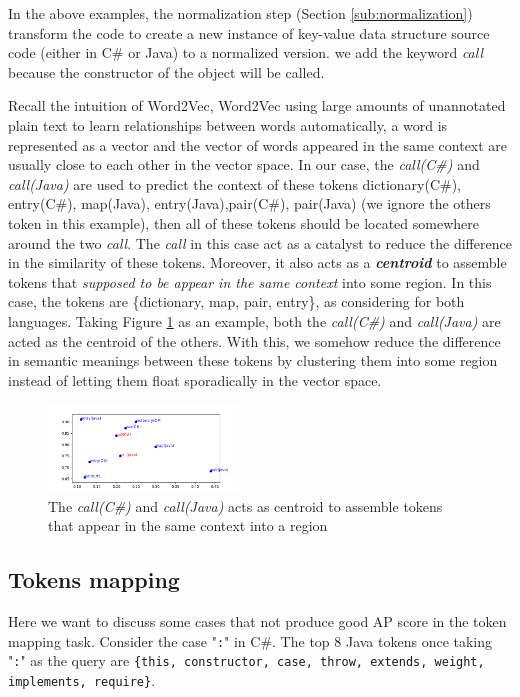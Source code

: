 In the above examples, the normalization step (Section \ref{sub:normalization}) transform the code to create a new instance of key-value data structure source code (either in C\# or Java) to a normalized version. we add the keyword \textit{call} because the constructor of the object will be called.

Recall the intuition of Word2Vec, Word2Vec using large amounts of unannotated plain text to learn relationships between words automatically, a word is represented as a vector and the vector of words appeared in the same context are usually close to each other in the vector space. In our case, the \textit{call(C\#)} and \textit{call(Java)} are used to predict the context of these tokens {dictionary(C\#), entry(C\#), map(Java), entry(Java),pair(C\#), pair(Java)} (we ignore the others token in this example), then all of these tokens should be located somewhere around the two \textit{call}. The \textit{call} in this case act as a catalyst to reduce the difference in the similarity of these tokens. Moreover, it also acts as a \textit{\textbf{centroid}} to assemble tokens that \textit{supposed to be appear in the same context} into some region. In this case, the tokens are \{dictionary, map, pair, entry\}, as considering for both languages. Taking Figure \ref{fig:mapping_explain} as an example, both the \textit{call(C\#)} and \textit{call(Java)} are acted as the centroid of the others. With this, we somehow reduce the difference in semantic meanings between these tokens by clustering them into some region instead of letting them float sporadically in the vector space.
\begin{figure}[t!]
	\includegraphics[width=0.45\textwidth]{mapping_explain}
	
	\caption{The \textit{call(C\#)} and \textit{call(Java)} acts as centroid to assemble tokens that appear in the same context into a region}
	\label{fig:mapping_explain}
	\medskip
\end{figure}

\subsection{Tokens mapping}
Here we want to discuss some cases that not produce good AP score in the token mapping task. Consider the case "\texttt{:}" in C\#. The top 8 Java tokens once taking "\texttt{:}" as the query are \texttt{\{this, constructor, case, throw, extends, weight, implements, require\}}. 

